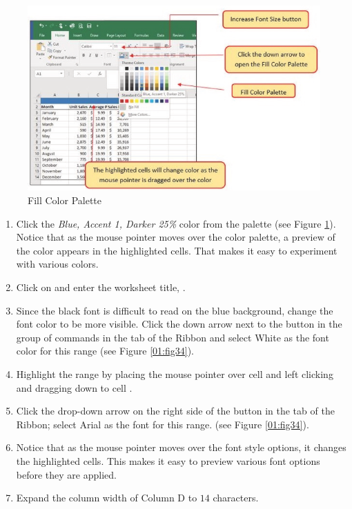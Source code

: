 \begin{figure}[H]
	\centering
	\includegraphics[width=\maxwidth{.95\linewidth}]{gfx/ch01_fig36}
	\caption{Fill Color Palette}
	\label{01:fig36}
\end{figure}

\begin{enumerate}[resume]
	\item Click the \textit{Blue, Accent 1, Darker 25\%} color from the palette (see Figure \ref{01:fig36}). Notice that as the mouse pointer moves over the color palette, a preview of the color appears in the highlighted cells. That makes it easy to experiment with various colors.
	\item Click on  and enter the worksheet title, .
	\item Since the black font is difficult to read on the blue background, change the font color to be more visible. Click the down arrow next to the  button in the  group of commands in the  tab of the Ribbon and select White as the font color for this range (see Figure \ref{01:fig34}).
	\item Highlight the range  by placing the mouse pointer over cell  and left clicking and dragging down to cell .
	\item Click the drop-down arrow on the right side of the  button in the  tab of the Ribbon; select Arial as the font for this range. (see Figure \ref{01:fig34}).
	\item Notice that as the mouse pointer moves over the font style options, it changes the highlighted cells. This makes it easy to preview various font options before they are applied.
	\item Expand the column width of Column D to $ 14 $ characters.
\end{enumerate}

